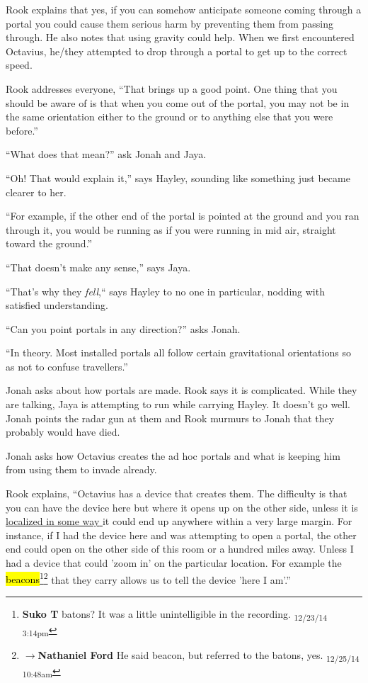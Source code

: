 Rook explains that yes, if you can somehow anticipate someone coming through a portal you could cause them serious harm by preventing them from passing through.  He also notes that using gravity could help.  When we first encountered Octavius, he/they attempted to drop through a portal to get up to the correct speed. 

Rook addresses everyone, ``That brings up a good point.  One thing that you should be aware of is that when you come out of the portal, you may not be in the same orientation either to the ground or to anything else that you were before.''

``What does that mean?'' ask Jonah and Jaya.

``Oh!   That would explain it,'' says Hayley, sounding like something just became clearer to her.

``For example, if the other end of the portal is pointed at the ground and you ran through it, you would be running as if you were running in mid air, straight toward the ground.''

``That doesn't make any sense,'' says Jaya.

``That's why they \textit{fell},`` says Hayley to no one in particular, nodding with satisfied understanding.

``Can you point portals in any direction?'' asks Jonah.

``In theory.  Most installed portals all follow certain gravitational orientations so as not to confuse travellers.''



Jonah asks about how portals are made.  Rook says it is complicated.  While they are talking, Jaya is attempting to run while carrying Hayley.  It doesn't go well.  Jonah points the radar gun at them and Rook murmurs to Jonah that they probably would have died.

Jonah asks how Octavius creates the ad hoc portals and what is keeping him from using them to invade already.

Rook explains, ``Octavius has a device that creates them.  The difficulty is that you can have the device here but where it opens up on the other side, unless it is \underline{  {\color[RGB]{17,85,204}localized in some way}  } it could end up anywhere within a very large margin.  For instance, if I had the device here and was attempting to open a portal, the other end could open on the other side of this room or a hundred miles away.  Unless I had a device that could 'zoom in' on the particular location.  For example the \hl{beacons}\footnote{\textbf{Suko T }batons?  It was a little unintelligible in the recording. \textsubscript{12/23/14 3:14pm}}\footnote{$\rightarrow$\textbf{Nathaniel Ford }He said beacon, but referred to the batons, yes. \textsubscript{12/25/14 10:48am}} that they carry allows us to tell the device 'here I am'.''

